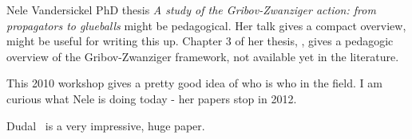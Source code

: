 \begin{description}
Nele Vandersickel PhD thesis {\em A study of the
Gribov-Zwanziger action: from propagators to glueballs} might be
pedagogical. Her
{talk} gives a compact overview, might be useful for writing this up.
Chapter 3 of her thesis, , gives a
pedagogic overview of the Gribov-Zwanziger framework, not available yet
in the literature.

This 2010  {workshop}
gives a pretty good idea of who is who in the field. I am curious what
Nele is doing today - 
{her papers} stop in 2012.

Dudal~\etal{} is a very impressive, huge paper.

\end{description}
\renewcommand{\ssp}{a}
